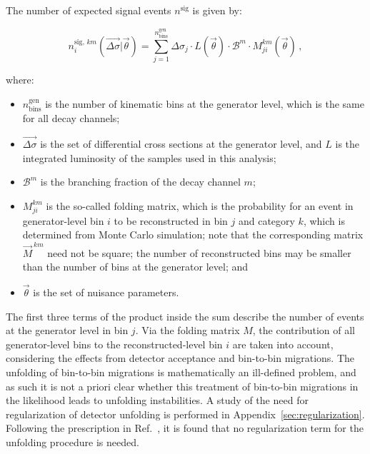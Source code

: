 The number of expected signal events $n^\text{sig}$ is given by:
% 
\begin{linenomath*}
\begin{equation}
n_i^{\text{sig},\,km}(\vec{\Delta\sigma} | \vec{\theta})
= \sum_{j=1}^{n_\text{bins}^\text{gen}}
    \Delta\sigma_j \cdot L(\vec{\theta})
     \cdot \mathcal{B}^{m}
     \cdot M_{ji}^{km}(\vec{\theta})
\,,
\label{eq:nsig}
\end{equation}
\end{linenomath*}
% 
where:
% 
\begin{itemize}
% 
\item $n_\text{bins}^\text{gen}$ is the number of kinematic bins at the generator level, which is the same for all decay channels;
% 
\item $\vec{\Delta\sigma}$ is the set of differential cross sections at the generator level, and $L$ is the integrated luminosity of the samples used in this analysis;
% 
\item $\mathcal{B}^m$ is the branching fraction of the decay channel $m$;
% 
\item $M_{ji}^{km}$ is the so-called folding matrix, which is the probability for an event in generator-level bin $i$ to be reconstructed in bin $j$ and category $k$, which is determined from Monte Carlo simulation;
% 
note that the corresponding matrix $\vec{M}^{\,km}$ need not be square; the number of reconstructed bins may be smaller than the number of bins at the generator level; and
% 
\item $\vec{\theta}$ is the set of nuisance parameters.
\end{itemize}
% 
The first three terms of the product inside the sum describe the number of events at the generator level in bin $j$.
% 
Via the folding matrix $M$, the contribution of all generator-level bins to the reconstructed-level bin $i$ are taken into account, considering the effects from detector acceptance and bin-to-bin migrations.
% 
The unfolding of bin-to-bin migrations is mathematically an ill-defined problem, and as such it is not a priori clear whether this treatment of bin-to-bin migrations in the likelihood leads to unfolding instabilities.
% 
A study of the need for regularization of detector unfolding is performed in Appendix~\ref{sec:regularization}.
% 
Following the prescription in Ref.~\cite{Hansen:LShape}, it is found that no regularization term for the unfolding procedure is needed.


